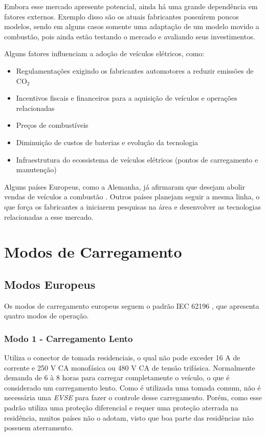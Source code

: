     Embora esse mercado apresente potencial, ainda há uma grande dependência em fatores externos. Exemplo disso são os atuais fabricantes possuírem poucos modelos, sendo em alguns casos somente uma adaptação de um modelo movido a combustão, pois ainda estão testando o mercado e avaliando seus investimentos.

    Alguns fatores influenciam a adoção de veículos elétricos, como:

    \begin{itemize}
      \item Regulamentações exigindo os fabricantes automotores a reduzir emissões de CO$_2$
      \item Incentivos fiscais e financeiros para a aquisição de veículos e operações relacionadas
      \item Preços de combustíveis
      \item Diminuição de custos de baterias e evolução da tecnologia
      \item Infraestrutura do ecossistema de veículos elétricos (pontos de carregamento e manutenção)
    \end{itemize}

    Alguns países Europeus, como a Alemanha, já afirmaram que desejam abolir vendas de veículos a combustão \cite{forbes-news-germany}. Outros países planejam seguir a mesma linha, o que força os fabricantes a iniciarem pesquisas na área e desenvolver as tecnologias relacionadas a esse mercado.

  \section{Modos de Carregamento}
  \label{stateofart:modes}

    \subsection{Modos Europeus}
    \label{stateofart:modes:europe}

      Os modos de carregamento europeus seguem o padrão IEC 62196 \cite{iec-62196}, que apresenta quatro modos de operação.

        \subsubsection{Modo 1 - Carregamento Lento}
        \label{stateofart:modes:europe:mode1}

        Utiliza o conector de tomada residenciais, o qual não pode exceder 16 A de corrente e 250 V \ac{CA} monofásica ou 480 V \ac{CA} de tensão trifásica. Normalmente demanda de 6 à 8 horas para carregar completamente o veículo, o que é considerado um carregamento lento. Como é utilizada uma tomada comum, não é necessária uma \textit{\ac{EVSE}} para fazer o controle desse carregamento. Porém, como esse padrão utiliza uma proteção diferencial e requer uma proteção aterrada na residência, muitos países não o adotam, visto que boa parte das residências não possuem aterramento.

